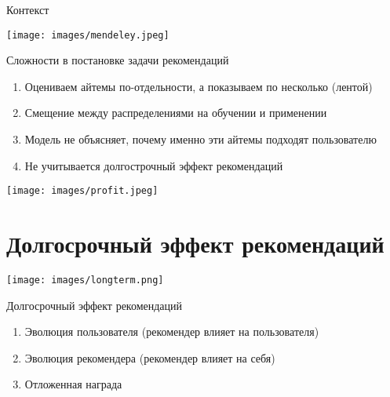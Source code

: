 \documentclass[11pt,aspectratio=169,handout]{beamer}
\author{Николай Анохин}
\title{Recommendations + Reinforcement Learning = \ensuremath\heartsuit}
\begin{document}
{

\begin{frame}
\titlepage
\end{frame}


}

\begin{frame}{Контекст}

\begin{center}
\texttt{[image: images/mendeley.jpeg]}
\end{center}

\end{frame}

\begin{frame}{Сложности в постановке задачи рекомендаций}

\begin{enumerate}
\item Оцениваем айтемы по-отдельности, а показываем по несколько (лентой)
\item Смещение между распределениями на обучении и применении
\item Модель не объясняет, почему именно эти айтемы подходят пользователю
\item {\color{blue} Не учитывается долгострочный эффект рекомендаций}
\end{enumerate}

\begin{center}
\texttt{[image: images/profit.jpeg]}
\end{center}

\end{frame}

\section{Долгосрочный эффект рекомендаций}

\begin{frame}{}

\begin{center}
\texttt{[image: images/longterm.png]}
\end{center}

\end{frame}

\begin{frame}{Долгосрочный эффект рекомендаций}

\begin{tcolorbox}[colback=info!5,colframe=info!80,title=]
\begin{enumerate}[<+->]
\item Эволюция пользователя (рекомендер влияет на пользователя)
\item Эволюция рекомендера (рекомендер влияет на себя)
\item Отложенная награда
\end{enumerate}
\end{tcolorbox}

\end{frame}
\end{document}
